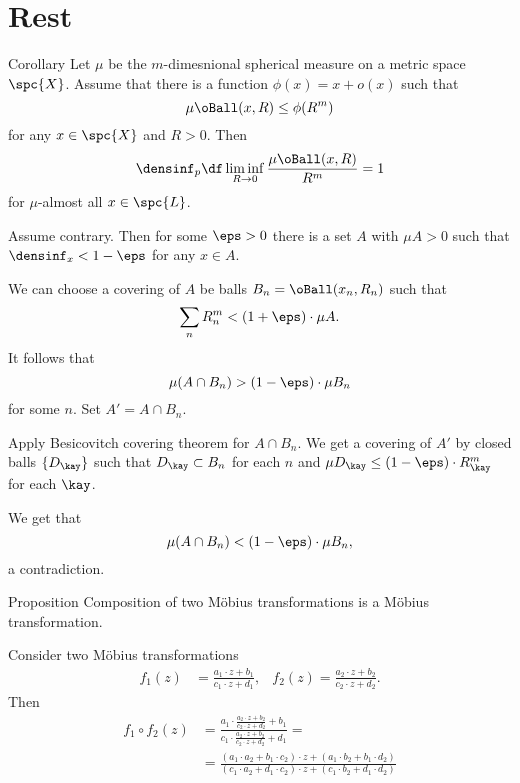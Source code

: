 \section{Rest}

\begin{thm}{Corollary}
Let $\mu$ be the $m$-dimesnional spherical measure on a metric space $\spc{X}$.
Assume that 
there is a function $\phi(x)=x+o(x)$ such that
$$\mu\oBall(x,R)\le\phi(R^m)$$
for any $x\in\spc{X}$ and $R>0$.
Then 
$$\densinf_p\df\liminf_{R\to0}\frac{\mu\oBall(x,R)}{R^m}=1$$
for $\mu$-almost all $x\in\spc{L}$.
\end{thm}

Assume contrary.
Then for some $\eps>0$ there is a set $A$ with $\mu A>0$
such that $\densinf_x<1-\eps$
for any $x\in A$.

We can choose a covering of $A$ be balls $B_n=\oBall(x_n,R_n)$
such that 
\[\sum_n R_n^m<(1+\eps)\cdot\mu A.\]
It follows that
$$\mu(A\cap B_n)>(1-\eps)\cdot\mu B_n$$
for some $n$.
Set $A'=A\cap B_n$.

Apply Besicovitch covering theorem for $A\cap B_n$.
We get a covering of $A'$ by closed balls $\{D_\kay\}$ such that
$D_\kay\subset B_n$ for each $n$ and 
$\mu D_\kay\le (1-\eps)\cdot R^m_\kay$ for each $\kay$.

We get that 
$$\mu(A\cap B_n)<(1-\eps)\cdot  \mu B_n,$$
a contradiction.
\qeds











\begin{thm}{Proposition}
Composition of two M\"obius transformations is a M\"obius transformation.
\end{thm}

Consider two M\"obius transformations
\begin{align*}
f_1(z)&=\frac{a_1\cdot z + b_1}{c_1\cdot z + d_1},
&
f_2(z)=\frac{a_2\cdot z + b_2}{c_2\cdot z + d_2}.
\end{align*}
Then 
\begin{align*}
f_1\circ f_2(z)
&=\frac{a_1\cdot\frac{a_2\cdot z + b_2}{c_2\cdot z + d_2}  + b_1}{c_1\cdot\frac{a_2\cdot z + b_2}{c_2\cdot z + d_2}  + d_1}
=
\\
&=\frac{(a_1\cdot a_2+b_1\cdot c_2)\cdot z+(a_1\cdot b_2+b_1\cdot d_2)}
{(c_1\cdot a_2+d_1\cdot c_2)\cdot z+(c_1\cdot b_2+d_1\cdot d_2)}
\end{align*}

